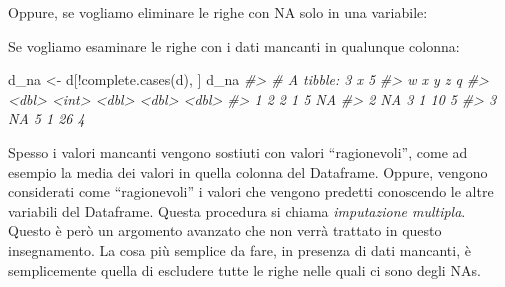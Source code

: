 \documentclass[
]{memoir}
\newenvironment{Shaded}{\begin{snugshade}}{\end{snugshade}}
\newcommand{\CommentTok}[1]{\textcolor[rgb]{0.56,0.35,0.01}{\textit{#1}}}
\newcommand{\FunctionTok}[1]{\textcolor[rgb]{0.00,0.00,0.00}{#1}}
\newcommand{\NormalTok}[1]{#1}
\newcommand{\OtherTok}[1]{\textcolor[rgb]{0.56,0.35,0.01}{#1}}
\newcommand{\SpecialCharTok}[1]{\textcolor[rgb]{0.00,0.00,0.00}{#1}}
\theoremstyle{definition}
\theoremstyle{definition}
\theoremstyle{definition}
\theoremstyle{definition}
\theoremstyle{remark}
\begin{document}
Oppure, se vogliamo eliminare le righe con NA solo in una variabile:

\begin{Shaded}
\end{Shaded}

Se vogliamo esaminare le righe con i dati mancanti in qualunque colonna:

\begin{Shaded}
\begin{Highlighting}[]
\NormalTok{d\_na }\OtherTok{\textless{}{-}}\NormalTok{ d[}\SpecialCharTok{!}\FunctionTok{complete.cases}\NormalTok{(d), ]}
\NormalTok{d\_na}
\CommentTok{\#\textgreater{} \# A tibble: 3 x 5}
\CommentTok{\#\textgreater{}       w     x     y     z     q}
\CommentTok{\#\textgreater{}   \textless{}dbl\textgreater{} \textless{}int\textgreater{} \textless{}dbl\textgreater{} \textless{}dbl\textgreater{} \textless{}dbl\textgreater{}}
\CommentTok{\#\textgreater{} 1     2     2     1     5    NA}
\CommentTok{\#\textgreater{} 2    NA     3     1    10     5}
\CommentTok{\#\textgreater{} 3    NA     5     1    26     4}
\end{Highlighting}
\end{Shaded}

Spesso i valori mancanti vengono sostiuti con valori ``ragionevoli'', come ad esempio la media dei valori in quella colonna del Dataframe. Oppure, vengono considerati come ``ragionevoli'' i valori che vengono predetti conoscendo le altre variabili del Dataframe. Questa procedura si chiama \emph{imputazione multipla}. Questo è però un argomento avanzato che non verrà trattato in questo insegnamento. La cosa più semplice da fare, in presenza di dati mancanti, è semplicemente quella di escludere tutte le righe nelle quali ci sono degli NAs.

  
\end{document}
